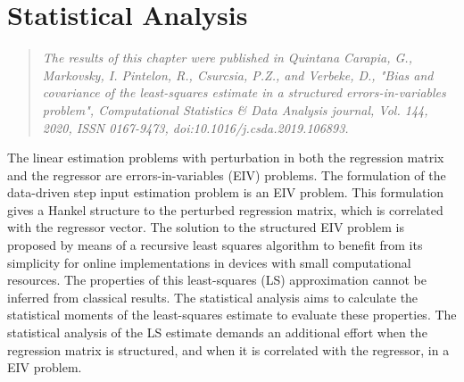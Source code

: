 \glsresetall

\chapter{Statistical Analysis} \label{chap:StatisticalAnalysis}


\begin{quote}
\emph{The results of this chapter were published in Quintana Carapia, G., Markovsky, I. Pintelon, R., Csurcsia, P.Z., and Verbeke, D., "Bias and covariance of the least-squares estimate in a structured errors-in-variables problem", Computational Statistics \& Data Analysis journal, Vol. 144, 2020, ISSN 0167-9473, doi:10.1016/j.csda.2019.106893. \nocite{QuintanaCSDA} }%
\end{quote}

\vfill{}


The linear estimation problems with perturbation in both the regression matrix and the regressor are errors-in-variables (EIV) problems.
\color{blue} The formulation of the data-driven step input estimation problem is an EIV problem.
This formulation gives a Hankel structure to the perturbed regression matrix, which is correlated with the regressor vector.
The solution to the structured EIV problem is proposed by means of a recursive least squares algorithm to benefit from its simplicity for online implementations in devices with small computational resources.
The properties of this least-squares (LS) approximation cannot be inferred from classical results\color{black}.
\color{blue} The statistical analysis aims \color{black} to calculate the statistical moments of the \color{blue} least-squares \color{black} estimate to evaluate these properties.
The statistical analysis of the LS estimate demands \color{blue} an additional effort \color{black} when the regression matrix is structured, and when it is correlated with the regressor, in a EIV problem.

